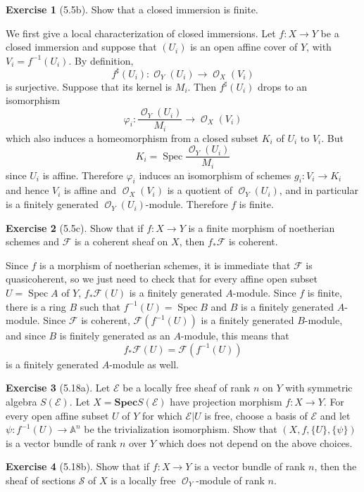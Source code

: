\documentclass[10pt]{article}
\newcommand{\Aff}{\mathbb A}
\newcommand{\Spec}{\operatorname{Spec}}
\newcommand{\SymSpec}{\mathbf{Spec}}
\DeclareMathOperator{\Olo}{\mathscr O}
\theoremstyle{definition}
\newtheorem{exer}{Exercise}
\begin{document}
\begin{exer}[5.5b]
Show that a closed immersion is finite.
\end{exer}

We first give a local characterization of closed immersions.
Let $f: X \to Y$ be a closed immersion and suppose that $(U_i)$ is an open affine cover of $Y$, with $V_i = f^{-1}(U_i)$.
By definition,
$$f^\sharp(U_i): \Olo_Y(U_i) \to \Olo_X(V_i)$$
is surjective. Suppose that its kernel is $M_i$. Then $f^\sharp(U_i)$ drops to an isomorphism
$$\varphi_i: \frac{\Olo_Y(U_i)}{M_i} \to \Olo_X(V_i)$$
which also induces a homeomorphism from a closed subset $K_i$ of $U_i$ to $V_i$.
But
$$K_i = \Spec \frac{\Olo_Y(U_i)}{M_i}$$
since $U_i$ is affine.
Therefore $\varphi_i$ induces an isomorphism of schemes $g_i: V_i \to K_i$ and hence $V_i$ is affine and $\Olo_X(V_i)$ is a quotient of $\Olo_Y(U_i)$, and in particular is a finitely generated $\Olo_Y(U_i)$-module.
Therefore $f$ is finite.

\begin{exer}[5.5c]
Show that if $f: X \to Y$ is a finite morphism of noetherian schemes and $\mathscr F$ is a coherent sheaf on $X$, then $f_* \mathscr F$ is coherent.
\end{exer}

Since $f$ is a morphism of noetherian schemes, it is immediate that $\mathscr F$ is quasicoherent, so we just need to check that for every affine open subset $U = \Spec A$ of $Y$, $f_* \mathscr F(U)$ is a finitely generated $A$-module.
Since $f$ is finite, there is a ring $B$ such that $f^{-1}(U) = \Spec B$ and $B$ is a finitely generated $A$-module.
Since $\mathscr F$ is coherent, $\mathscr F(f^{-1}(U))$ is a finitely generated $B$-module, and since $B$ is finitely generated as an $A$-module, this means that
$$f_* \mathscr F(U) = \mathscr F(f^{-1}(U))$$
is a finitely generated $A$-module as well.

\begin{exer}[5.18a]
Let $\mathscr E$ be a locally free sheaf of rank $n$ on $Y$ with symmetric algebra $S(\mathscr E)$.
Let $X = \SymSpec S(\mathscr E)$ have projection morphism $f: X \to Y$.
For every open affine subset $U$ of $Y$ for which $\mathscr E|U$ is free, choose a basis of $\mathscr E$ and let $\psi: f^{-1}(U) \to \Aff^n$ be the trivialization isomorphism.
Show that $(X, f, \{U\}, \{\psi\})$ is a vector bundle of rank $n$ over $Y$ which does not depend on the above choices.
\end{exer}

\begin{exer}[5.18b]
Show that if $f: X \to Y$ is a vector bundle of rank $n$, then the sheaf of sections $\mathscr S$ of $X$ is a locally free $\Olo_Y$-module of rank $n$.
\end{exer}
\end{document}
